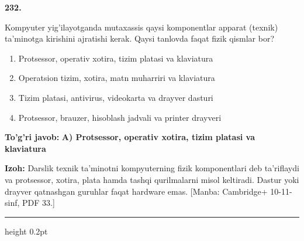 \documentclass[10pt,a4paper]{article}
\begin{document}
{\bfseries\sffamily\color{ink} 232.}
\par
Kompyuter yig'ilayotganda mutaxassis qaysi komponentlar apparat (texnik) ta'minotga kirishini ajratishi kerak. Qaysi tanlovda faqat fizik qismlar bor?
\begin{enumerate}[label=\Alph*),leftmargin=9mm]
\item Protsessor, operativ xotira, tizim platasi va klaviatura
\item Operatsion tizim, xotira, matn muharriri va klaviatura
\item Tizim platasi, antivirus, videokarta va drayver dasturi
\item Protsessor, brauzer, hisoblash jadvali va printer drayveri
\end{enumerate}
\begin{tcolorbox}[enhanced,breakable,colback=teal!4,colframe=teal!60!black,boxrule=0.45pt,arc=1.2mm,left=2.7mm,right=2.7mm,top=1.8mm,bottom=1.8mm,before skip=2mm,after skip=2mm]
{\bfseries\sffamily\color{teal}To'g'ri javob:} \textbf{A) Protsessor, operativ xotira, tizim platasi va klaviatura}
\par\smallskip
{\bfseries Izoh:} Darslik texnik ta'minotni kompyuterning fizik komponentlari deb ta'riflaydi va protsessor, xotira, plata hamda tashqi qurilmalarni misol keltiradi. Dastur yoki drayver qatnashgan guruhlar faqat hardware emas. [Manba: Cambridge+ 10-11-sinf, PDF 33.]
\end{tcolorbox}
\vspace{2mm}\hrule height 0.2pt\vspace{3mm}
\end{document}

